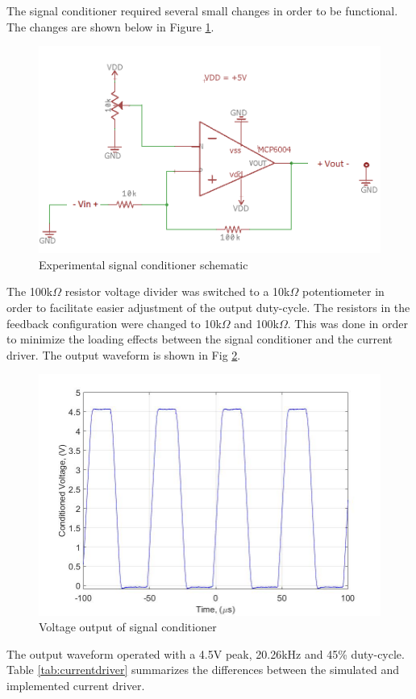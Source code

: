 
	
The signal conditioner required several small changes in order to be functional. The changes are shown below in Figure \ref{fig:signalconditionerexperimentalschem}.


\begin{figure}[H]
	\centering
	\includegraphics[width=0.6\linewidth]{ExperimentalImplementation/SignalConditionerExperimentalSchem}
	\caption{Experimental signal conditioner schematic}
	\label{fig:signalconditionerexperimentalschem}
\end{figure}

 The 100k$\Omega$ resistor voltage divider was switched to a 10k$\Omega$ potentiometer in order to facilitate easier adjustment of the output duty-cycle. The resistors in the feedback configuration were changed to 10k$\Omega$ and 100k$\Omega$. This was done in order to minimize the loading effects between the signal conditioner and the current driver. The output waveform is shown in Fig \ref{fig:conditionedvoltagelab4}.

\begin{figure}[H]
	\centering
	\includegraphics[width=0.6\linewidth]{ExperimentalImplementation/conditioned_voltage_lab4}
	\caption[Experimental signal conditioner]{Voltage output of signal conditioner}
	\label{fig:conditionedvoltagelab4}
\end{figure}

The output waveform operated with a 4.5V peak, 20.26kHz and 45\% duty-cycle. Table \ref{tab:currentdriver} summarizes the differences between the simulated and implemented current driver.  


